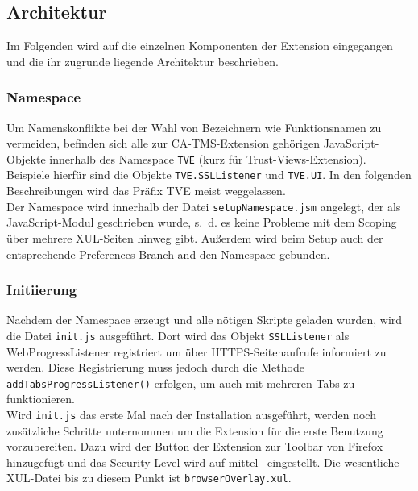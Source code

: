 \documentclass[accentcolor=tud1c,article,colorback,11pt]{tudreport}
\begin{document}
\subsection{Architektur}
Im Folgenden wird auf die einzelnen Komponenten der Extension eingegangen und die ihr zugrunde liegende Architektur beschrieben.

\subsubsection{Namespace}
Um Namenskonflikte bei der Wahl von Bezeichnern wie Funktionsnamen zu vermeiden, befinden sich alle zur CA-TMS-Extension gehörigen JavaScript-Objekte innerhalb des Namespace \texttt{TVE} (kurz für Trust-Views-Extension). Beispiele hierfür sind die Objekte \texttt{TVE.SSLListener} und \texttt{TVE.UI}. In den folgenden Beschreibungen wird das Präfix TVE meist weggelassen.\\
Der Namespace wird innerhalb der Datei \texttt{setupNamespace.jsm} angelegt, der als JavaScript-Modul \cite{jsm} geschrieben wurde, s.~d. es keine Probleme mit dem Scoping über mehrere XUL-Seiten hinweg gibt. Außerdem wird beim Setup auch der entsprechende Preferences-Branch and den Namespace gebunden.

\subsubsection{Initiierung}
Nachdem der Namespace erzeugt und alle nötigen Skripte geladen wurden, wird die Datei \texttt{init.js} ausgeführt. Dort wird das Objekt \texttt{SSLListener} als WebProgressListener registriert um über HTTPS-Seitenaufrufe informiert zu werden. Diese Registrierung muss jedoch durch die Methode \texttt{addTabsProgressListener()} \cite{allTabs} erfolgen, um auch mit mehreren Tabs zu funktionieren.\\
Wird \texttt{init.js} das erste Mal nach der Installation ausgeführt, werden noch zusätzliche Schritte unternommen um die Extension für die erste Benutzung vorzubereiten. Dazu wird der Button der Extension zur Toolbar von Firefox hinzugefügt und das Security-Level wird auf \glqq mittel\grqq~ eingestellt. Die wesentliche XUL-Datei bis zu diesem Punkt ist \texttt{browserOverlay.xul}.
\end{document}
